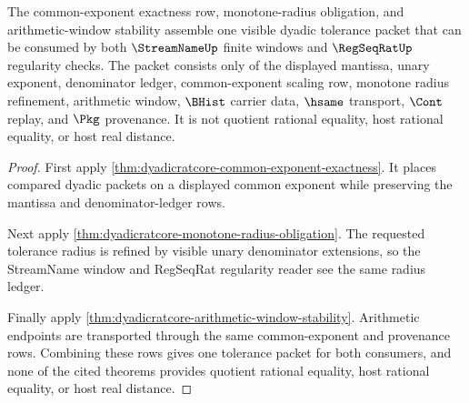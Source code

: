 \begin{theorem}
\label{thm:dyadicratcore-streamname-regseqrat-common-tolerance-extraction}
The common-exponent exactness row, monotone-radius obligation, and arithmetic-window stability assemble one visible dyadic tolerance packet that can be consumed by both $\StreamNameUp$ finite windows and $\RegSeqRatUp$ regularity checks. The packet consists only of the displayed mantissa, unary exponent, denominator ledger, common-exponent scaling row, monotone radius refinement, arithmetic window, $\BHist$ carrier data, $\hsame$ transport, $\Cont$ replay, and $\Pkg$ provenance. It is not quotient rational equality, host rational equality, or host real distance.
\end{theorem}
\begin{proof}
First apply \autoref{thm:dyadicratcore-common-exponent-exactness}. It places compared dyadic packets on a displayed common exponent while preserving the mantissa and denominator-ledger rows.

Next apply \autoref{thm:dyadicratcore-monotone-radius-obligation}. The requested tolerance radius is refined by visible unary denominator extensions, so the StreamName window and RegSeqRat regularity reader see the same radius ledger.

Finally apply \autoref{thm:dyadicratcore-arithmetic-window-stability}. Arithmetic endpoints are transported through the same common-exponent and provenance rows. Combining these rows gives one tolerance packet for both consumers, and none of the cited theorems provides quotient rational equality, host rational equality, or host real distance.
\end{proof}

